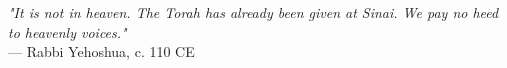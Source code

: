 \begin{flushright}
\emph{"It is not in heaven. The Torah has already been given at Sinai. We pay no heed to heavenly voices."}\\
— Rabbi Yehoshua, c. 110 CE
\end{flushright} 
